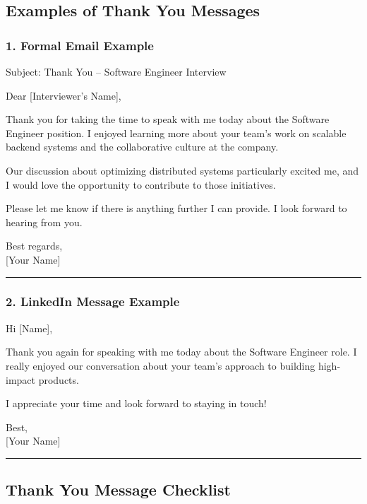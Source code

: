 \documentclass[
]{book}
\theoremstyle{definition}
\theoremstyle{definition}
\theoremstyle{definition}
\theoremstyle{definition}
\theoremstyle{remark}
\begin{document}
\subsection{Examples of Thank You Messages}\label{examples-of-thank-you-messages}

\subsubsection{1. Formal Email Example}\label{formal-email-example}

Subject: Thank You -- Software Engineer Interview

Dear {[}Interviewer's Name{]},

Thank you for taking the time to speak with me today about the Software Engineer position. I enjoyed learning more about your team's work on scalable backend systems and the collaborative culture at the company.

Our discussion about optimizing distributed systems particularly excited me, and I would love the opportunity to contribute to those initiatives.

Please let me know if there is anything further I can provide. I look forward to hearing from you.

Best regards,\\
{[}Your Name{]}

\begin{center}\rule{0.5\linewidth}{0.5pt}\end{center}

\subsubsection{2. LinkedIn Message Example}\label{linkedin-message-example}

Hi {[}Name{]},

Thank you again for speaking with me today about the Software Engineer role. I really enjoyed our conversation about your team's approach to building high-impact products.

I appreciate your time and look forward to staying in touch!

Best,\\
{[}Your Name{]}

\begin{center}\rule{0.5\linewidth}{0.5pt}\end{center}

\subsection{Thank You Message Checklist}\label{thank-you-message-checklist}
\end{document}
